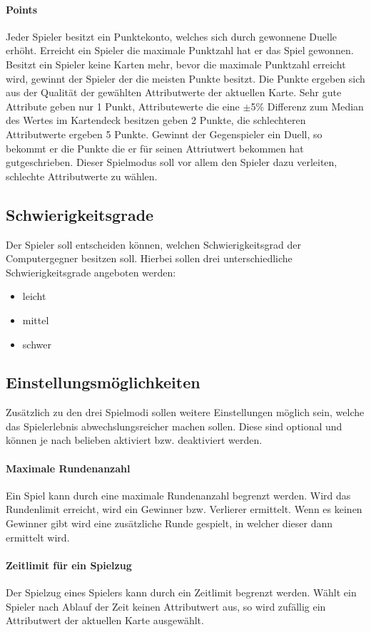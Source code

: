 \paragraph{Points}
Jeder Spieler besitzt ein Punktekonto, welches sich durch gewonnene Duelle erhöht. Erreicht ein Spieler die maximale Punktzahl hat er das Spiel gewonnen. Besitzt ein Spieler keine Karten mehr, bevor die maximale Punktzahl erreicht wird, gewinnt der Spieler der die meisten Punkte besitzt. Die Punkte ergeben sich aus der Qualität der gewählten Attributwerte der aktuellen Karte. Sehr gute Attribute geben nur 1 Punkt, Attributewerte die eine $\pm$5\% Differenz zum Median des Wertes im Kartendeck besitzen geben 2 Punkte, die schlechteren Attributwerte ergeben 5 Punkte. Gewinnt der Gegenspieler ein Duell, so bekommt er die Punkte die er für seinen Attriutwert bekommen hat gutgeschrieben. Dieser Spielmodus soll vor allem den Spieler dazu verleiten, schlechte Attributwerte zu wählen.

\subsection{Schwierigkeitsgrade}
Der Spieler soll entscheiden können, welchen Schwierigkeitsgrad der Computergegner besitzen soll. Hierbei sollen drei unterschiedliche Schwierigkeitsgrade angeboten werden:
\begin{itemize}
\item leicht
\item mittel
\item schwer
\end{itemize}

\subsection{Einstellungsmöglichkeiten}
Zusätzlich zu den drei Spielmodi sollen weitere Einstellungen möglich sein, welche das Spielerlebnis abwechslungsreicher machen sollen. Diese sind optional und können je nach belieben aktiviert bzw. deaktiviert werden.
\paragraph{Maximale Rundenanzahl}
Ein Spiel kann durch eine maximale Rundenanzahl begrenzt werden. Wird das Rundenlimit erreicht, wird ein Gewinner bzw. Verlierer ermittelt. Wenn es keinen Gewinner gibt wird eine zusätzliche Runde gespielt, in welcher dieser dann ermittelt wird.
\paragraph{Zeitlimit für ein Spielzug}
Der Spielzug eines Spielers kann durch ein Zeitlimit begrenzt werden. Wählt ein Spieler nach Ablauf der Zeit keinen Attributwert aus, so wird zufällig ein Attributwert der aktuellen Karte ausgewählt.

